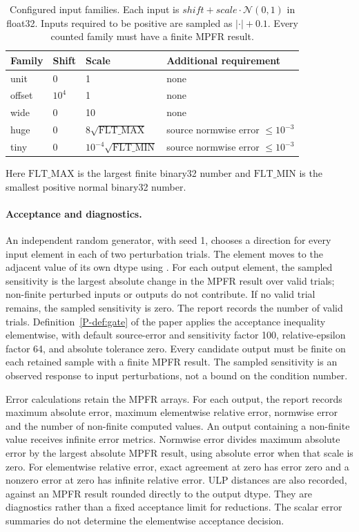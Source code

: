 \documentclass[acmsmall,screen,review,anonymous,nonacm]{acmart}
\newcommand{\pref}[1]{\ref{P-#1} of the paper}
\begin{document}
\begin{table}[t]
\caption{Configured input families. Each input is $\mathit{shift}+\mathit{scale}\cdot\mathcal{N}(0,1)$ in float32. Inputs required to be positive are sampled as $|\cdot|+0.1$. Every counted family must have a finite MPFR result.}
\label{tab:families}
\small
\begin{tabular}{@{}llll@{}}
\toprule
\textbf{Family} & \textbf{Shift} & \textbf{Scale} & \textbf{Additional requirement}\\
\midrule
unit & 0 & 1 & none\\
offset & $10^4$ & 1 & none\\
wide & 0 & 10 & none\\
huge & 0 & $8\sqrt{\mathrm{FLT\_MAX}}$ & source normwise error $\leq10^{-3}$\\
tiny & 0 & $10^{-4}\sqrt{\mathrm{FLT\_MIN}}$ & source normwise error $\leq10^{-3}$\\
\bottomrule
\end{tabular}
\end{table}
Here $\mathrm{FLT\_MAX}$ is the largest finite binary32 number and $\mathrm{FLT\_MIN}$ is the smallest positive normal binary32 number.

\paragraph{Acceptance and diagnostics.}
An independent random generator, with seed 1, chooses a direction for every input element in each of two perturbation trials.
The element moves to the adjacent value of its own dtype using .
For each output element, the sampled sensitivity is the largest absolute change in the MPFR result over valid trials; non-finite perturbed inputs or outputs do not contribute.
If no valid trial remains, the sampled sensitivity is zero.
The report records the number of valid trials.
Definition~\pref{def:gate} applies the acceptance inequality elementwise, with default source-error and sensitivity factor 100, relative-epsilon factor 64, and absolute tolerance zero.
Every candidate output must be finite on each retained sample with a finite MPFR result.
The sampled sensitivity is an observed response to input perturbations, not a bound on the condition number.

Error calculations retain the MPFR arrays.
For each output, the report records maximum absolute error, maximum elementwise relative error, normwise error and the number of non-finite computed values.
An output containing a non-finite value receives infinite error metrics.
Normwise error divides maximum absolute error by the largest absolute MPFR result, using absolute error when that scale is zero.
For elementwise relative error, exact agreement at zero has error zero and a nonzero error at zero has infinite relative error.
ULP distances are also recorded, against an MPFR result rounded directly to the output dtype.
They are diagnostics rather than a fixed acceptance limit for reductions.
The scalar error summaries do not determine the elementwise acceptance decision.
\end{document}
